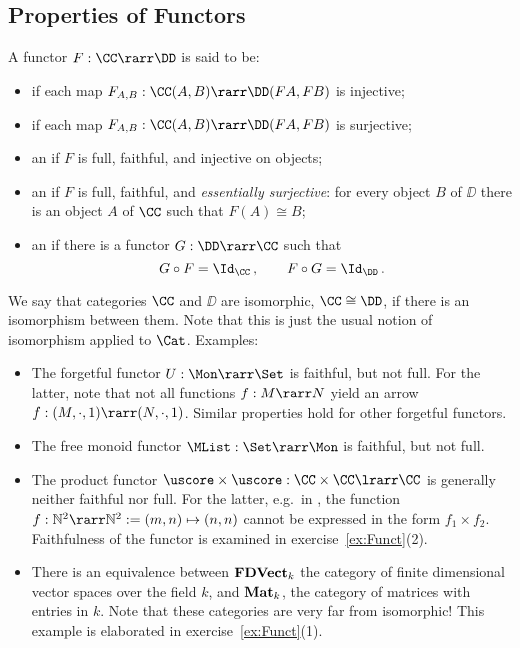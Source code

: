 \documentclass{svmult}
\begin{document}
\subsection{Properties of Functors}
\begin{mydefinition}\label{d:equiv1}
A functor $F:\CC\rarr\DD$ is said to be:
\begin{itemize}
\item {} if each map $F_{A,B}: \CC(A,B)\rarr\DD(FA,FB)$ is injective;
\item {} if each map $F_{A,B} :\CC (A, B) \rarr\DD (FA, FB)$ is surjective;
\item an  if $F$ is full, faithful, and injective on objects;
\item an  if $F$ is  full, faithful, and \emph{essentially surjective}: \ie for every object $B$ of $\DD$ there is
    an object $A$ of $\CC$ such that $F(A) \cong B$;
\item an  if there is a functor $G:\DD\rarr\CC$ such that
\[ G \circ F = \Id_{\CC}\,, \qquad F \circ G = \Id_{\DD}\,. \]
\deq[-1]
\end{itemize}
\end{mydefinition}
%
We say that categories $\CC$ and $\DD$ are isomorphic, $\CC\cong\DD$, if there is an isomorphism between them.
Note that this is just the usual notion of isomorphism applied to $\Cat$.
%
Examples:
\begin{itemize}
\item The forgetful functor $U : \Mon\rarr\Set$  is faithful, but not full. For the latter, note that not all functions $f:M\rarr N$ yield an arrow
    $f:(M,\cdot,1)\rarr(N,\cdot,1)$. Similar properties hold for other forgetful functors.
\item The free monoid functor $\MList:\Set\rarr\Mon$ is faithful, but not full.
\item The product functor $\uscore\times\uscore:\CC\times\CC\lrarr\CC$ is generally neither faithful nor full.
    For the latter, e.g.~in \Set, the function $f:\mathbb{N}^2\rarr\mathbb{N}^2:=(m,n)\mapsto(n,n)$ cannot be expressed in the form $f_1\times f_2$. Faithfulness of the functor is examined in exercise~\ref{ex:Funct}(2).
\item There is an equivalence between $\text{\textbf{FDVect}}_{k}$ the category of finite dimensional vector spaces over the field $k$, and
$\text{\textbf{Mat}}_{k}$, the category of matrices with entries in  $k$. Note that these categories are  very far from isomorphic! This example is elaborated in  exercise~\ref{ex:Funct}(1).
\end{itemize}
\end{document}
